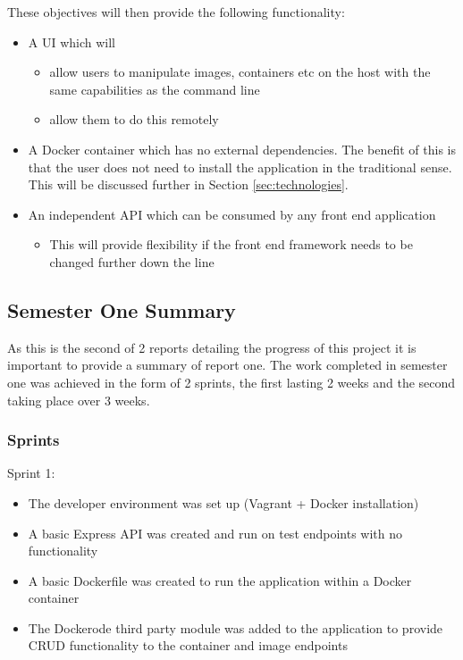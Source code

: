 These objectives will then provide the following functionality:

\begin{itemize}
	\item A UI which will 
	\begin{itemize}
		\item allow users to manipulate images, containers etc on the host with the same capabilities as the command line
		\item allow them to do this remotely
	\end{itemize}
	\item A \gls{Docker container} which has no external dependencies. The benefit of this is that the user does not need to install the application in the traditional sense. This will be discussed further in Section \ref{sec:technologies}.
	\item An independent API which can be consumed by any front end application
	\begin{itemize}
		\item This will provide flexibility if the front end framework needs to be changed further down the line
	\end{itemize}
\end{itemize}

\subsection{Semester One Summary}
As this is the second of 2 reports detailing the progress of this project it is important to provide a summary of report one. The work completed in semester one was achieved in the form of 2 \glspl{sprint}, the first lasting 2 weeks and the second taking place over 3 weeks.

\subsubsection{Sprints}
Sprint 1:
\begin{itemize}
	\item The developer environment was set up (Vagrant + Docker installation)
	\item A basic Express \gls{API} was created and run on test endpoints with no functionality
	\item A basic Dockerfile was created to run the application within a Docker container
	\item The Dockerode third party module was added to the application to provide \gls{CRUD} functionality to the container and image endpoints
\end{itemize} 
	
